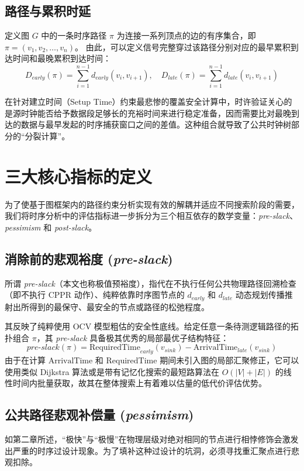 \subsection{路径与累积时延}
定义图 $G$ 中的一条时序路径 $\pi$ 为连接一系列顶点的边的有序集合，即 $\pi = (v_1, v_2, \dots, v_n)$。
由此，可以定义信号完整穿过该路径分别对应的最早累积到达时间和最晚累积到达时间：
\begin{displaymath}
    D_{early}(\pi) = \sum_{i=1}^{n-1} d_{early}(v_i, v_{i+1}), \quad D_{late}(\pi) = \sum_{i=1}^{n-1} d_{late}(v_i, v_{i+1})
\end{displaymath}

在针对建立时间（Setup Time）约束最悲惨的覆盖安全计算中，时许验证关心的是源时钟能否给予数据段足够长的充裕时间来进行稳定准备，因而需要比对最晚到达的数据与最早发起的时序捕获窗口之间的差值。这种组合就导致了公共时钟树部分的“分裂计算”。

\section{三大核心指标的定义}
\label{sec:core_metrics_def}

为了使基于图框架内的路径约束分析实现有效的解耦并适应不同搜索阶段的需要，我们将时序分析中的评估指标进一步拆分为三个相互依存的数学变量：\textit{pre-slack}、\textit{pessimism} 和 \textit{post-slack}。

\subsection{消除前的悲观裕度 (\textit{pre-slack})}
所谓 \textit{pre-slack}（本文也称极值预裕度），指代在不执行任何公共物理路径回溯检查（即不执行 CPPR 动作）、纯粹依靠时序图节点的 $d_{early}$ 和 $d_{late}$ 动态规划传播推射出所得到的最保守、最安全的节点或路径的松弛程度。

其反映了纯粹使用 OCV 模型粗估的安全性底线。给定任意一条待测逻辑路径的拓扑组合 $\pi$，其 \textit{pre-slack} 具备极其优秀的局部最优子结构特征：
\begin{equation}
    pre\text{-}slack(\pi) = \text{RequiredTime}_{early}(v_{sink}) - \text{ArrivalTime}_{late}(v_{sink})
\end{equation}
由于在计算 $\text{ArrivalTime}$ 和 $\text{RequiredTime}$ 期间未引入图的局部汇聚修正，它可以使用类似 Dijkstra 算法或是带有记忆化搜索的最短路算法在 $O(|V| + |E|)$ 的线性时间内批量获取，故其在整体搜索上有着难以估量的低代价评估优势。

\subsection{公共路径悲观补偿量 (\textit{pessimism})}
如第二章所述，“极快”与“极慢”在物理层级对绝对相同的节点进行相悖修饰会激发出严重的时序过设计现象。为了填补这种过设计的坑洞，必须寻找重汇聚点进行悲观扣除。


